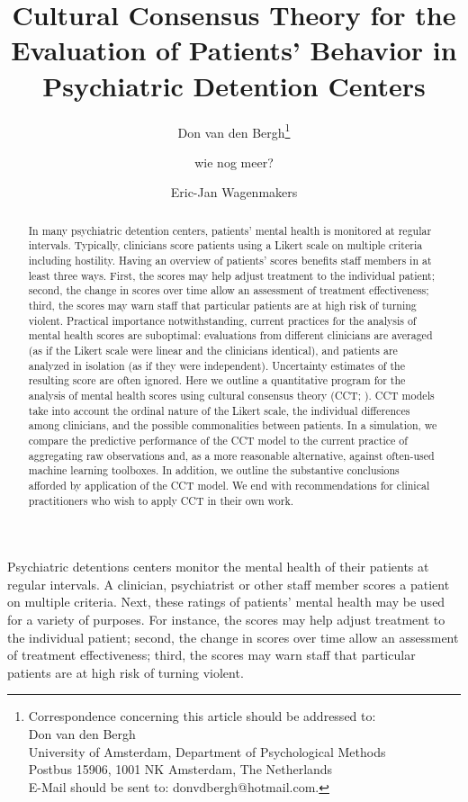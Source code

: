 \documentclass{article}
\title{Cultural Consensus Theory for the Evaluation of Patients’ Behavior in Psychiatric  Detention Centers}
\author[1]{Don van den Bergh\thanks{Correspondence concerning this article should be addressed to:  
\\  Don van den Bergh 
\\  University of Amsterdam, Department of Psychological Methods
\\  Postbus 15906, 1001 NK Amsterdam, The Netherlands
\\  E-Mail should be sent to: donvdbergh@hotmail.com.}}
\author[1]{wie nog meer?}
\author[1]{Eric-Jan Wagenmakers}
\affil[1]{University of Amsterdam}
\date{}
\begin{document}
\maketitle

\begin{abstract}
In many psychiatric detention centers, patients' mental health is monitored at regular intervals. Typically, clinicians score patients using a Likert scale on multiple criteria including hostility. Having an overview of patients’ scores benefits staff members in at least three ways. First, the scores may help adjust treatment to the individual patient; second, the change in scores over time allow an assessment of treatment effectiveness; third, the scores may warn staff that particular patients are at high risk of turning violent. Practical importance notwithstanding, current practices for the analysis of mental health scores are suboptimal: evaluations from different clinicians are averaged (as if the Likert scale were linear and the clinicians identical), and patients are analyzed in isolation (as if they were independent). Uncertainty estimates of the resulting score are often ignored. Here we outline a quantitative program for the analysis of mental health scores using cultural consensus theory (CCT; ). CCT models take into account the ordinal nature of the Likert scale, the individual differences among clinicians, and the possible commonalities between patients. In a simulation, we compare the predictive performance of the CCT model to the current practice of aggregating raw observations and, as a more reasonable alternative, against often-used machine learning toolboxes. In addition, we outline the substantive conclusions afforded by application of the CCT model. We end with recommendations for clinical practitioners who wish to apply CCT in their own work. 
\end{abstract}

\newpage


Psychiatric detentions centers monitor the mental health of their patients at regular intervals. A clinician, psychiatrist or other staff member scores a patient on multiple criteria. Next, these ratings of patients' mental health may be used for a variety of purposes. For instance, the scores may help adjust treatment to the individual patient; second, the change in scores over time allow an assessment of treatment effectiveness; third, the scores may warn staff that particular patients are at high risk of turning violent. 
\end{document}
